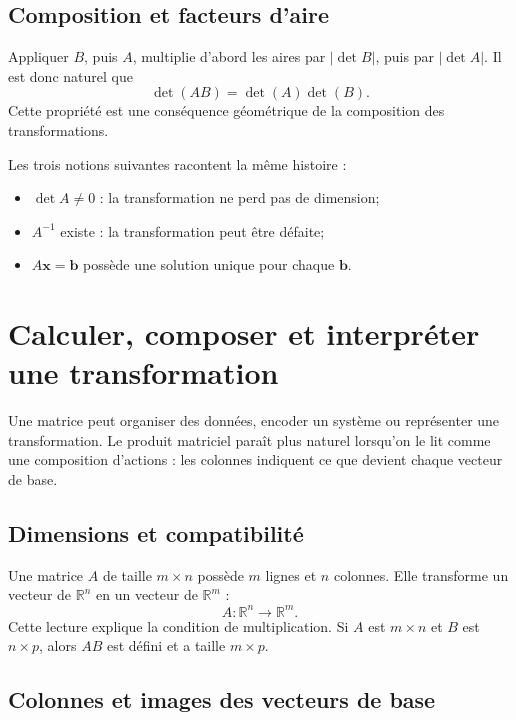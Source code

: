 \documentclass[12pt,a4paper,openany]{book}
\newcommand{\R}{\mathbb{R}}
\begin{document}
\subsection{Composition et facteurs d'aire}
Appliquer $B$, puis $A$, multiplie d'abord les aires par $|\det B|$, puis par $|\det A|$. Il est donc naturel que
\[
\det(AB)=\det(A)\det(B).
\]
Cette propriété est une conséquence géométrique de la composition des transformations.

\begin{connectionbox}
Les trois notions suivantes racontent la même histoire :
\begin{itemize}
\item $\det A\ne0$ : la transformation ne perd pas de dimension;
\item $A^{-1}$ existe : la transformation peut être défaite;
\item $A\mathbf x=\mathbf b$ possède une solution unique pour chaque $\mathbf b$.
\end{itemize}
\end{connectionbox}


\section{Calculer, composer et interpréter une transformation}

Une matrice peut organiser des données, encoder un système ou représenter une transformation. Le produit matriciel paraît plus naturel lorsqu'on le lit comme une composition d'actions : les colonnes indiquent ce que devient chaque vecteur de base.

\subsection{Dimensions et compatibilité}

Une matrice $A$ de taille $m\times n$ possède $m$ lignes et $n$ colonnes. Elle transforme un vecteur de $\R^n$ en un vecteur de $\R^m$ :
\[
A:\R^n\longrightarrow\R^m.
\]
Cette lecture explique la condition de multiplication. Si $A$ est $m\times n$ et $B$ est $n\times p$, alors $AB$ est défini et a taille $m\times p$.

\subsection{Colonnes et images des vecteurs de base}
\end{document}
